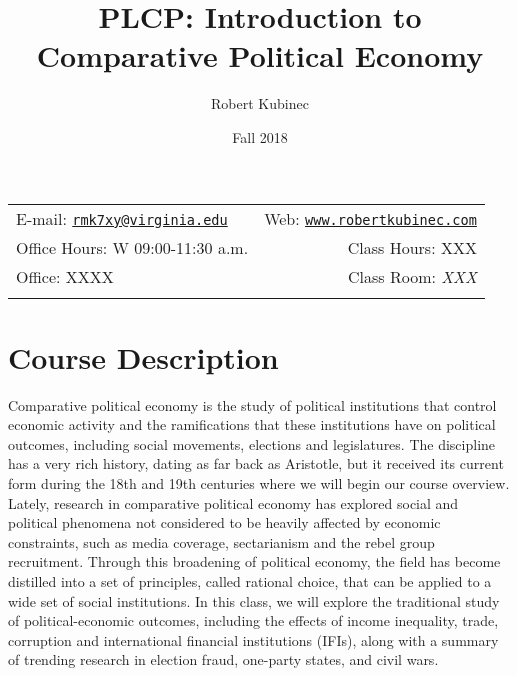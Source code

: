 \documentclass[11pt,]{article}
\title{PLCP: Introduction to Comparative Political Economy}
\author{Robert Kubinec}
\date{Fall 2018}
\begin{document}
  

		\maketitle
		
	
		\thispagestyle{firststyle}



	\noindent \begin{tabular*}{\textwidth}{ @{\extracolsep{\fill}} lr @{\extracolsep{\fill}}}


E-mail: \texttt{\href{mailto:rmk7xy@virginia.edu}{\nolinkurl{rmk7xy@virginia.edu}}} & Web: \href{http://www.robertkubinec.com}{\tt www.robertkubinec.com}\\
Office Hours: W 09:00-11:30 a.m.  &  Class Hours: XXX\\
Office: XXXX  & Class Room: \emph{XXX}\\
	&  \\
	\hline
	\end{tabular*}
	
\vspace{2mm}
	


\section{Course Description}\label{course-description}

Comparative political economy is the study of political institutions
that control economic activity and the ramifications that these
institutions have on political outcomes, including social movements,
elections and legislatures. The discipline has a very rich history,
dating as far back as Aristotle, but it received its current form during
the 18th and 19th centuries where we will begin our course overview.
Lately, research in comparative political economy has explored social
and political phenomena not considered to be heavily affected by
economic constraints, such as media coverage, sectarianism and the rebel
group recruitment. Through this broadening of political economy, the
field has become distilled into a set of principles, called rational
choice, that can be applied to a wide set of social institutions. In
this class, we will explore the traditional study of political-economic
outcomes, including the effects of income inequality, trade, corruption
and international financial institutions (IFIs), along with a summary of
trending research in election fraud, one-party states, and civil wars.
\end{document}
